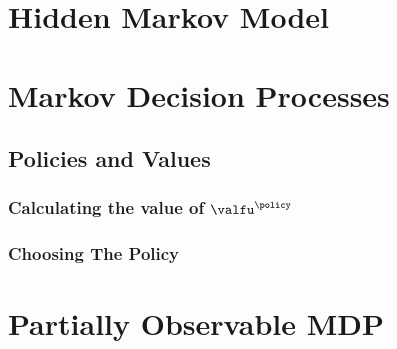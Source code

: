   \section{Hidden Markov Model }\label{sec:hidden_markov_model}
      
  \section{Markov Decision Processes }\label{sec:markov_decision_processes}
      
      \subsection{Policies and Values}\label{subsec:policies}
        
      \subsubsection{Calculating the value of $\valfu^{\policy}$}\label{subsubsec:calculating_the_value_of_V}
        
      \subsubsection{Choosing The Policy}\label{subsubsec:choosing_the_policy}
        
      \label{subsubsubsec:greedy_policy}
        
        
        \label{subsubsubsec:policy_iteration}
          
        \label{subsubsubsec:value_iteration}
          
  \section{Partially Observable MDP }\label{sec:partially_observable_markov_decision_processes}
      

